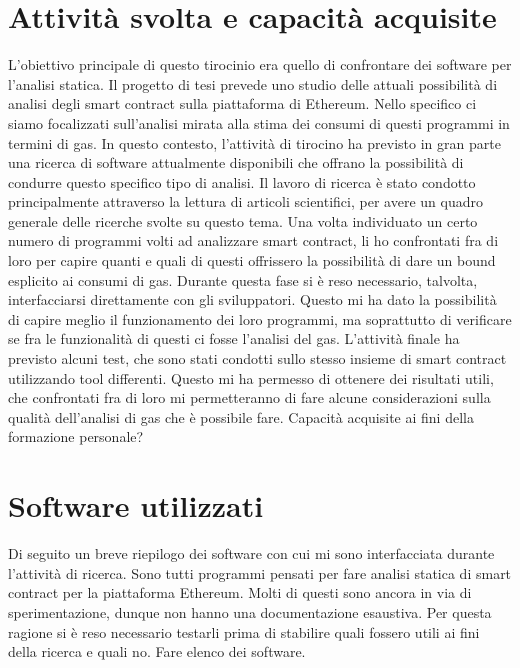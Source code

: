 \documentclass[a4paper,10pt]{article}
\begin{document}
\section{Attività svolta e capacità acquisite}
L'obiettivo principale di questo tirocinio era quello di confrontare dei software per l'analisi statica.\newline
Il progetto di tesi prevede uno studio delle attuali possibilità di analisi degli smart contract sulla piattaforma di Ethereum. Nello specifico ci siamo focalizzati sull'analisi mirata alla stima dei consumi di questi programmi in termini di gas.\newline
In questo contesto, l'attività di tirocino ha previsto in gran parte una ricerca di software attualmente disponibili che offrano la possibilità di condurre questo specifico tipo di analisi. Il lavoro di ricerca è stato condotto principalmente attraverso la lettura di articoli scientifici, per avere un quadro generale delle ricerche svolte su questo tema.\newline 
Una volta individuato un certo numero di programmi volti ad analizzare smart contract, li ho confrontati fra di loro per capire quanti e quali di questi offrissero la possibilità di dare un bound esplicito ai consumi di gas. Durante questa fase si è reso necessario, talvolta, interfacciarsi direttamente con gli sviluppatori. Questo mi ha dato la possibilità di capire meglio il funzionamento dei loro programmi, ma soprattutto di verificare se fra le funzionalità di questi ci fosse l'analisi del gas.\newline
L'attività finale ha previsto alcuni test, che sono stati condotti sullo stesso insieme di smart contract utilizzando tool differenti. Questo mi ha permesso di ottenere dei risultati utili, che confrontati fra di loro mi permetteranno di fare alcune considerazioni sulla qualità dell'analisi di gas che è possibile fare.\newline
\newline
Capacità acquisite ai fini della formazione personale?

\section{Software utilizzati}
Di seguito un breve riepilogo dei software con cui mi sono interfacciata durante l'attività di ricerca.\newline
Sono tutti programmi pensati per fare analisi statica di smart contract per la piattaforma Ethereum. Molti di questi sono ancora in via di sperimentazione, dunque non hanno una documentazione esaustiva. Per questa ragione si è reso necessario testarli prima di stabilire quali fossero utili ai fini della ricerca e quali no.\newline
\newline
Fare elenco dei software.
\end{document}
